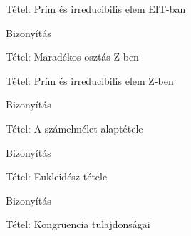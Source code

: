 \documentclass{beamer}
\begin{document}
\begin{frame}

\begin{block}{Tétel: Prím és irreducibilis elem EIT-ban}
\end{block}

\begin{block}{Bizonyítás}
\end{block}

\end{frame}

\begin{frame}

\begin{block}{Tétel: Maradékos osztás Z-ben}
\end{block}

\end{frame}

\begin{frame}

\begin{block}{Tétel: Prím és irreducibilis elem Z-ben}
\end{block}

\begin{block}{Bizonyítás}
\end{block}

\end{frame}

\begin{frame}

\begin{block}{Tétel: A számelmélet alaptétele}
\end{block}

\begin{block}{Bizonyítás}
\end{block}

\end{frame}

\begin{frame}

\begin{block}{Tétel: Eukleidész tétele}
\end{block}

\begin{block}{Bizonyítás}
\end{block}

\end{frame}

\begin{frame}

\begin{block}{Tétel: Kongruencia tulajdonságai}
\end{block}

\end{frame}
\end{document}
